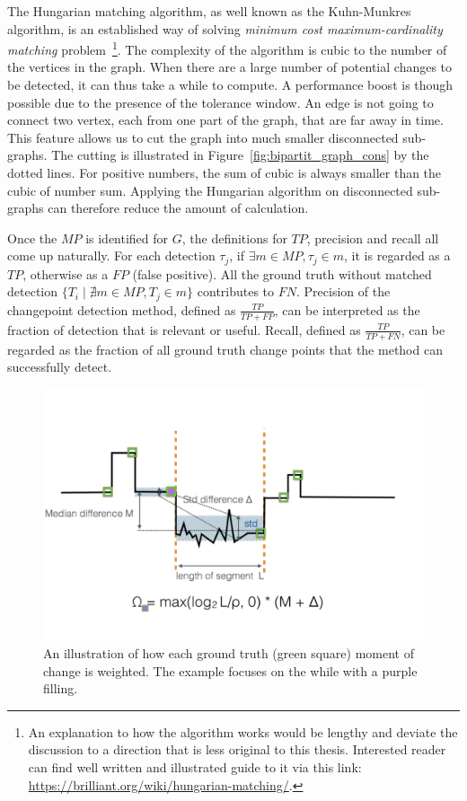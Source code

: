 The Hungarian matching algorithm, as well known as the Kuhn-Munkres algorithm, is an established way of solving \textit{minimum cost maximum-cardinality matching} problem~\footnote{An explanation to how the algorithm works would be lengthy and deviate the discussion to a direction that is less original to this thesis. Interested reader can find well written and illustrated guide to it via this link: \url{https://brilliant.org/wiki/hungarian-matching/}.}. 
The complexity of the algorithm is cubic to the number of the vertices in the graph.
When there are a large number of potential changes to be detected, it can thus take a while to compute.
A performance boost is though possible due to the presence of the tolerance window.
An edge is not going to connect two vertex, each from one part of the graph, that are far away in time.
This feature allows us to cut the graph into much smaller disconnected sub-graphs.
The cutting is illustrated in Figure~\ref{fig:bipartit_graph_cons} by the dotted lines.
For positive numbers, the sum of cubic is always smaller than the cubic of number sum.
Applying the Hungarian algorithm on disconnected sub-graphs can therefore reduce the amount of calculation.

Once the $MP$ is identified for $G$, the definitions for $TP$, precision and recall all come up naturally.
For each detection $\tau_j$, if $\exists m \in MP, \tau_j \in m$, it is regarded as a $TP$, otherwise as a $FP$ (false positive).
All the ground truth without matched detection $\{T_i \mid \nexists m \in MP, T_j \in m\}$ contributes to $FN$.
Precision of the changepoint detection method, defined as  $\frac{TP}{TP+FP}$, can be interpreted as the fraction of detection that is relevant or useful.
Recall, defined as $\frac{TP}{TP+FN}$, can be regarded as the fraction of all ground truth change points that the method can successfully detect.


\begin{figure}[!htb]
\centering
\includegraphics[width=.95\textwidth]{gfx/chap4/groundtruth_weight.pdf}
\caption{An illustration of how each ground truth (green square) moment of change is weighted. The example focuses on the while with a purple filling.}
\label{fig:groundtruth_weight}
\end{figure}

